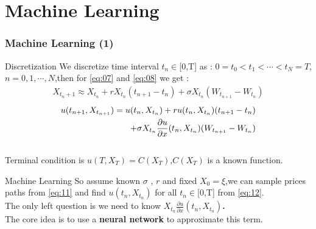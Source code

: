 \documentclass[mathserif,10pt]{beamer}
\renewcommand{\alert}[1]{\textcolor{MyRed}{#1}\xspace}
\renewcommand{\emph}[1]{\textbf{#1}\xspace}
\begin{document}
\section{Machine Learning}
\begin{frame}
\frametitle{Machine Learning (1)}
\begin{block}{Discretization}
We discretize time interval $t_n\in$[0,T] as :
$0=t_0<t_1<\cdots <t_N=T$, $n=0,1,\cdots,N$,then for \eqref{eq:07} and \eqref{eq:08} we get :
\begin{align*}
X_{t_n+1}\approx X_{t_n}+rX_{t_n} (t_{n+1}-t_n)
  +\sigma X_{t_n}(W_{t_{n+1}}-W_{t_n})
\end{align*}
\begin{align*}
u(t_{n+1},X_{t_{n+1}})=u(t_{n},X_{t_{n}})
+ru(t_{n},X_{t_{n}})(t_{n+1}-t_{n})\\
+\sigma X_{t_n}\frac{\partial u}{\partial x}(t_n,X_{t_n})(W_{t_{n+1}}-W_{t_{n}})\hfill
\end{align*} \\
Terminal condition is $u(T,X_T)=C(X_T)$,$C(X_T)$ is a known function.
\end{block}

\begin{block}{Machine Learning}
So  assume known $\sigma$ , $r$ and fixed $X_0=\xi$,we can sample prices paths from \eqref{eq:11} and find $u(t_n,X_{t_n})$ for all $t_n\in$[0,T] from \eqref{eq:12}.\\
The only left question is we need to know \emph{\alert{$X_{t_n}\frac{\partial u}{\partial x}(t_n,X_{t_n})$.}}\\
The core idea is to use a \emph{\alert{neural network}} to approximate this term.
\end{block}
\end{frame}
\end{document}
